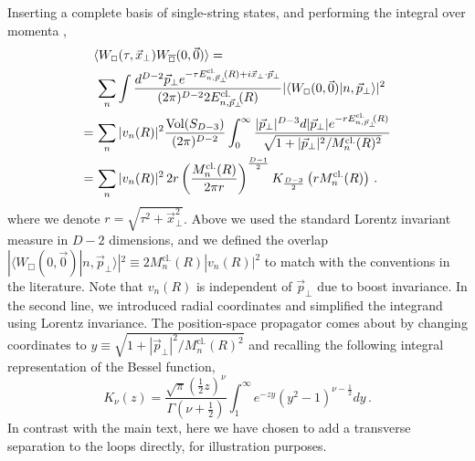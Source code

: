 \documentclass[
 reprint,
 amsmath,
 pre,
 amssymb,
 nofootinbib,
 aps,
 longbibliography,
]{revtex4-1}
\newcommand{\<}{{\langle}}
\renewcommand{\>}{{\rangle}}
\begin{document}
Inserting a complete basis of single-string states, and performing the integral over momenta \cite{Luscher:2004ib,Aharony:2010cx},
\begin{align}\label{eq:<WW>-app}
   & \langle W_{\Box}(\tau,\vec x_\bot)W_{\overline{\Box}}(0,\vec 0)\rangle =\\&\nonumber\, \sum_n \int \frac{d^{D-2}\vec p_\bot  e^{-\tau E^{\text{cl.}}_{n,\vec p_\bot}\hspace{-3pt}(R) + i\vec x_\bot \cdot \vec p_\bot}}{(2\pi)^{D-2} 2E^{\text{cl.}}_{n,\vec p_\bot}\hspace{-3pt}(R)}
    |\langle W_{\Box}(0,\vec 0)|n,\vec p_\bot\rangle|^2 \\
    =&\, \sum_n |v_n(R)|^2 \frac{\text{Vol}(S_{D-3})}{(2\pi)^{D-2}}\int_0^\infty \frac{|\vec p_\bot|^{D-3}d|\vec p_\bot| e^{-r E^{\text{cl.}}_{n,\vec p_\bot}\hspace{-3pt}(R) }}{ \sqrt{1+ |\vec p_\bot|^2/M^{\text{cl.}}_n(R)^2 }}
    \nonumber
    \\
    =&\,
    \sum_n |v_n(R)|^2\, 2r
    \left(\frac{M_n^{\text{cl.}}(R)}{2\pi r}\right)^{\frac{D-1}{2}}
    K_{\frac{D-3}{2}}\left(r M_n^{\text{cl.}}(R)\right)\,.\nonumber
\end{align}
where we denote $r=\sqrt{\tau^2 + \vec x_\bot^2}$. Above we used the standard Lorentz invariant measure in $D-2$ dimensions, and we defined the overlap $|\langle W_{\Box}(0,\vec 0)|n,\vec p_\bot\rangle|^2\equiv 2M^{\text{cl.}}_n(R)|v_n(R)|^2 $ to match with the conventions in the literature.
Note that $v_n(R)$ is independent of $\vec p_\bot$ due to boost invariance.
In the second line, we introduced radial coordinates and simplified the integrand using Lorentz invariance. The position-space propagator comes about by changing coordinates to $y\equiv \sqrt{1+ |\vec p_\bot|^2/M^{\text{cl.}}_n(R)^2}$ and recalling the following integral representation of the Bessel function,
\begin{equation}
    K_\nu (z) = \frac{\sqrt{\pi} (\tfrac{1}{2}z)^\nu}{\Gamma(\nu + \tfrac{1}{2})} \int_1^\infty e^{-zy}(y^2-1)^{\nu - \frac{1}{2}}dy\,.
\end{equation}
In contrast with the main text, here we have chosen to add a transverse separation to the loops directly, for illustration purposes.
\end{document}
